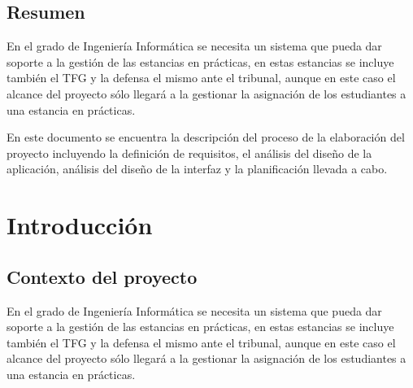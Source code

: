 \documentclass[pdftex,11pt,a4paper]{book}
\begin{document}

\thispagestyle{empty} %

\clearpage %

\section*{Resumen}

En el grado de Ingeniería Informática se necesita un sistema que pueda dar soporte a la gestión de las estancias en prácticas, en estas estancias se incluye también el TFG y la defensa el mismo ante el tribunal, aunque en este caso el alcance del proyecto sólo llegará a la gestionar la asignación de los estudiantes a una estancia en prácticas. 

En este documento se encuentra la descripción del proceso de la elaboración del proyecto incluyendo la definición de requisitos, el análisis del diseño de la aplicación, análisis del diseño de la interfaz y la planificación llevada a cabo.

\thispagestyle{empty} %

\cleardoublepage




\pagestyle{plain} %

\tableofcontents

\cleardoublepage


\chapter{Introducción}

\section{Contexto del proyecto}

En el grado de Ingeniería Informática se necesita un sistema que pueda dar soporte a la gestión de las estancias en prácticas, en estas estancias se incluye también el TFG y la defensa el mismo ante el tribunal, aunque en este caso el alcance del proyecto sólo llegará a la gestionar la asignación de los estudiantes a una estancia en prácticas.
\end{document}
